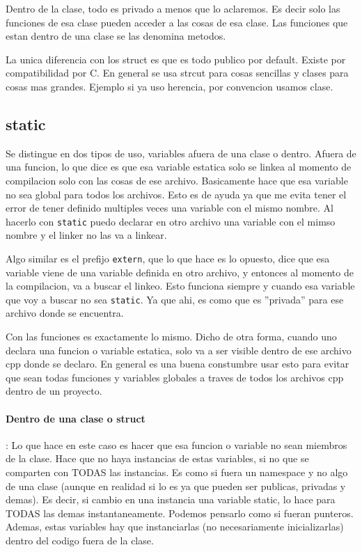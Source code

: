 \documentclass[11pt]{article}
\begin{document}
Dentro de la clase, todo es privado a menos que lo aclaremos.
Es decir solo las funciones de esa clase pueden acceder a las cosas de esa clase.
Las funciones que estan dentro de una clase se las denomina metodos.

La unica diferencia con los struct es que es todo publico por default.
Existe por compatibilidad por C.
En general se usa strcut para cosas sencillas y clases para cosas mas grandes.
Ejemplo si ya uso herencia, por convencion usamos clase.

\subsection{static}
Se distingue en dos tipos de uso, variables afuera de una clase o dentro.
Afuera de una funcion, lo que dice es que esa variable estatica solo se linkea al
momento de compilacion solo con las cosas de ese archivo.
Basicamente hace que esa variable no sea global para todos los archivos.
Esto es de ayuda ya que me evita tener el error de tener definido multiples veces
una variable con el mismo nombre.
Al hacerlo con \texttt{static} puedo declarar en otro archivo una variable
con el mimso nombre y el linker no las va a linkear.

Algo similar es el prefijo \texttt{extern}, que lo que hace es lo opuesto,
dice que esa variable viene de una variable definida en otro archivo, y entonces
al momento de la compilacion, va a buscar el linkeo.
Esto funciona siempre y cuando esa variable que voy a buscar no sea \texttt{static}.
Ya que ahi, es como que es ''privada'' para ese archivo donde se encuentra.

Con las funciones es exactamente lo mismo.
Dicho de otra forma, cuando uno declara una funcion o variable estatica,
solo va a ser visible dentro de ese archivo cpp donde se declaro.
En general es una buena constumbre usar esto para evitar que sean todas
funciones y variables globales a traves de todos los archivos cpp dentro de un
proyecto.

\paragraph{Dentro de una clase o struct}:
Lo que hace en este caso es hacer que esa funcion o variable no sean miembros de
la clase.
Hace que no haya instancias de estas variables, si no que se comparten con TODAS
las instancias.
Es como si fuera un namespace y no algo de una clase (aunque en realidad si lo
es ya que pueden ser publicas, privadas y demas).
Es decir, si cambio en una instancia una variable static, lo hace para TODAS
las demas instantaneamente.
Podemos pensarlo como si fueran punteros.
Ademas, estas variables hay que instanciarlas (no necesariamente inicializarlas)
dentro del codigo fuera de la clase.
\end{document}

